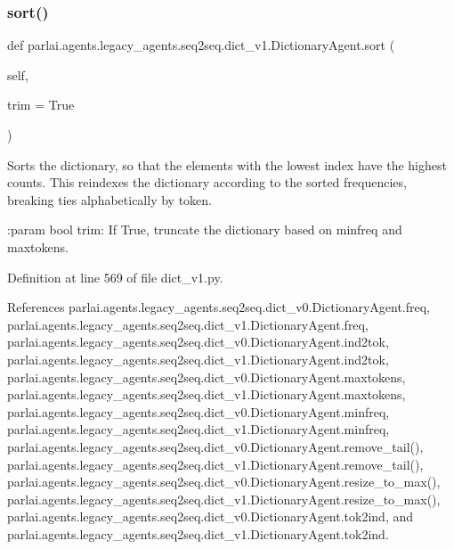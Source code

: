 \subsubsection{\texorpdfstring{sort()}{sort()}}
{\footnotesize\ttfamily def parlai.\+agents.\+legacy\+\_\+agents.\+seq2seq.\+dict\+\_\+v1.\+Dictionary\+Agent.\+sort (\begin{DoxyParamCaption}\item[{}]{self,  }\item[{}]{trim = {\ttfamily True} }\end{DoxyParamCaption})}

\begin{DoxyVerb}Sorts the dictionary, so that the elements with the lowest index have
the highest counts. This reindexes the dictionary according to the
sorted frequencies, breaking ties alphabetically by token.

:param bool trim: If True, truncate the dictionary based on minfreq and
    maxtokens.
\end{DoxyVerb}
 

Definition at line 569 of file dict\+\_\+v1.\+py.



References parlai.\+agents.\+legacy\+\_\+agents.\+seq2seq.\+dict\+\_\+v0.\+Dictionary\+Agent.\+freq, parlai.\+agents.\+legacy\+\_\+agents.\+seq2seq.\+dict\+\_\+v1.\+Dictionary\+Agent.\+freq, parlai.\+agents.\+legacy\+\_\+agents.\+seq2seq.\+dict\+\_\+v0.\+Dictionary\+Agent.\+ind2tok, parlai.\+agents.\+legacy\+\_\+agents.\+seq2seq.\+dict\+\_\+v1.\+Dictionary\+Agent.\+ind2tok, parlai.\+agents.\+legacy\+\_\+agents.\+seq2seq.\+dict\+\_\+v0.\+Dictionary\+Agent.\+maxtokens, parlai.\+agents.\+legacy\+\_\+agents.\+seq2seq.\+dict\+\_\+v1.\+Dictionary\+Agent.\+maxtokens, parlai.\+agents.\+legacy\+\_\+agents.\+seq2seq.\+dict\+\_\+v0.\+Dictionary\+Agent.\+minfreq, parlai.\+agents.\+legacy\+\_\+agents.\+seq2seq.\+dict\+\_\+v1.\+Dictionary\+Agent.\+minfreq, parlai.\+agents.\+legacy\+\_\+agents.\+seq2seq.\+dict\+\_\+v0.\+Dictionary\+Agent.\+remove\+\_\+tail(), parlai.\+agents.\+legacy\+\_\+agents.\+seq2seq.\+dict\+\_\+v1.\+Dictionary\+Agent.\+remove\+\_\+tail(), parlai.\+agents.\+legacy\+\_\+agents.\+seq2seq.\+dict\+\_\+v0.\+Dictionary\+Agent.\+resize\+\_\+to\+\_\+max(), parlai.\+agents.\+legacy\+\_\+agents.\+seq2seq.\+dict\+\_\+v1.\+Dictionary\+Agent.\+resize\+\_\+to\+\_\+max(), parlai.\+agents.\+legacy\+\_\+agents.\+seq2seq.\+dict\+\_\+v0.\+Dictionary\+Agent.\+tok2ind, and parlai.\+agents.\+legacy\+\_\+agents.\+seq2seq.\+dict\+\_\+v1.\+Dictionary\+Agent.\+tok2ind.



